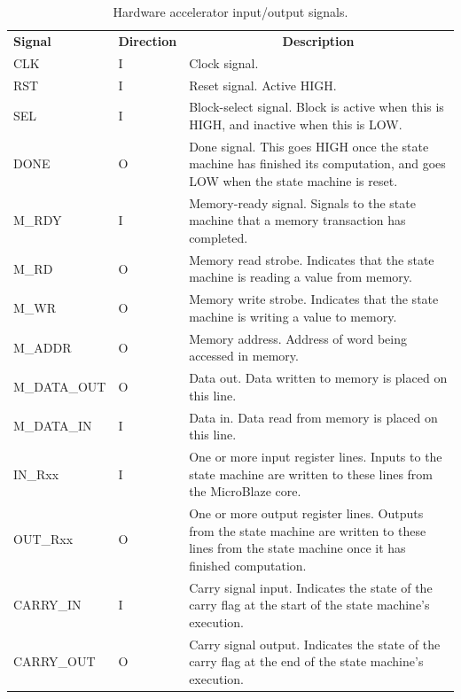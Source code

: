 \documentclass{UoYCSproject}
\begin{document}
\begin{table}[H]
\centering
\begin{tabular}{ |p{3cm}|p{2cm}|p{8cm}| }
\textbf{Signal} & \textbf{Direction} & \multicolumn{1}{c}{\textbf{Description}} \\
CLK             & I                  & Clock signal. \\[0.05cm]
RST             & I                  & Reset signal. Active HIGH. \\[0.05cm]
SEL             & I                  & Block-select signal. Block is active when this is HIGH, and inactive when this is LOW. \\[0.05cm]
DONE            & O                  & Done signal. This goes HIGH once the state machine has finished its computation, and goes LOW when the state machine is reset. \\[0.05cm]
M\_RDY          & I                  & Memory-ready signal. Signals to the state machine that a memory transaction has completed. \\[0.05cm]
M\_RD           & O                  & Memory read strobe. Indicates that the state machine is reading a value from memory. \\[0.05cm]
M\_WR           & O                  & Memory write strobe. Indicates that the state machine is writing a value to memory. \\[0.05cm]
M\_ADDR         & O                  & Memory address. Address of word being accessed in memory. \\[0.05cm]
M\_DATA\_OUT    & O                  & Data out. Data written to memory is placed on this line. \\[0.05cm]
M\_DATA\_IN     & I                  & Data in. Data read from memory is placed on this line. \\[0.05cm]
IN\_Rxx         & I                  & One or more input register lines. Inputs to the state machine are written to these lines from the MicroBlaze core. \\[0.05cm]
OUT\_Rxx        & O                  & One or more output register lines. Outputs from the state machine are written to these lines from the state machine once it has finished computation. \\[0.05cm]
CARRY\_IN       & I                  & Carry signal input. Indicates the state of the carry flag at the start of the state machine's execution. \\[0.05cm]
CARRY\_OUT      & O                  & Carry signal output. Indicates the state of the carry flag at the end of the state machine's execution.
\end{tabular}
\caption{Hardware accelerator input/output signals.}
\label{table:acceleratorSignals}
\end{table}
\end{document}
